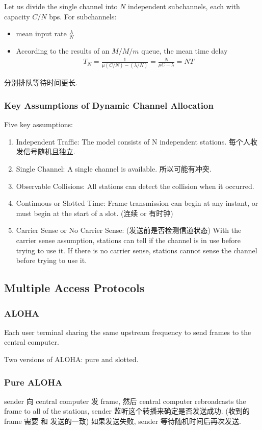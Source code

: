 Let us divide the single channel into $N$ independent subchannels, each with capacity $C/N$ bps. For subchannels:
\begin{itemize}
    \item mean input rate $\frac{\lambda}{N}$
    \item According to the results of an $M/M/m$ queue, the mean time delay
    \begin{align*}
        T_N=\frac{1}{\mu(C/N)-(\lambda /N)}=\frac{N}{\mu C-\lambda}=NT
    \end{align*}
\end{itemize}
分别排队等待时间更长. 

\subsubsection{Key Assumptions of Dynamic Channel Allocation}
Five key assumptions:
\begin{enumerate}\small
    \item Independent Traffic: The model consists of N independent stations. 每个人收发信号随机且独立. 
    \item Single Channel: A single channel is available. 所以可能有冲突. 
    \item Observable Collisions: All stations can detect the collision when it occurred. 
    \item Continuous or Slotted Time: Frame transmission can begin at any instant, or must begin at the start of a slot. (连续 or 有时钟)
    \item Carrier Sense or No Carrier Sense: (发送前是否检测信道状态) 
    \subitem With the carrier sense assumption, stations can tell if the channel is in use before trying to use it.
    \subitem If there is no carrier sense, stations cannot sense the channel before trying to use it. 
\end{enumerate}

\subsection{Multiple Access Protocols}
\subsubsection{ALOHA}
Each user terminal sharing the same upstream frequency to send frames to the central computer.

Two versions of ALOHA: pure and slotted.

\subsubsection{Pure ALOHA}
sender 向 central computer 发 frame, 然后 central computer rebroadcasts the frame to all of the stations, sender 监听这个转播来确定是否发送成功. (收到的frame 需要 和 发送的一致) 如果发送失败, sender 等待随机时间后再次发送. 

